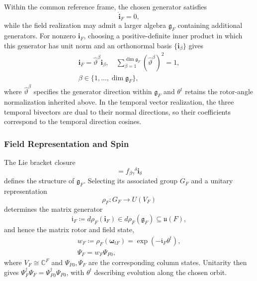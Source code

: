 Within the common reference frame, the chosen generator satisfies
\begin{equation}
    \dot{\mathbf{i}}_{F}=0,
\end{equation}
while the field realization may admit a larger algebra $\mathfrak{g}_{F}$ containing additional generators. For nonzero $\mathbf{i}_{F}$, choosing a positive-definite inner product in which this generator has unit norm and an orthonormal basis $\{\mathbf{i}_{\beta}\}$ gives
\begin{equation}\label{eq_generator_direction}
\begin{gathered}
    \mathbf{i}_{F}=\hat{\vartheta}^{\beta}\mathbf{i}_{\beta},\quad\sum_{\beta=1}^{\dim\mathfrak{g}_{F}}(\hat{\vartheta}^{\beta})^{2}=1,\\
    \beta\in\{1,\ldots,\dim\mathfrak{g}_{F}\},
\end{gathered}
\end{equation}
where $\hat{\vartheta}^{\beta}$ specifies the generator direction within $\mathfrak{g}_{F}$ and $\theta^{t}$ retains the rotor-angle normalization inherited above. In the temporal vector realization, the three temporal bivectors are dual to their normal directions, so their coefficients correspond to the temporal direction cosines.

\subsubsection{Field Representation and Spin}
The Lie bracket closure
\begin{equation}
    [\mathbf{i}_{\beta},\mathbf{i}_{\gamma}]=f_{\beta\gamma}{}^{\delta}\mathbf{i}_{\delta}
\end{equation}
defines the structure of $\mathfrak{g}_{F}$. Selecting its associated group $G_{F}$ and a unitary representation
\begin{equation}
    \rho_{F}:G_{F}\rightarrow U(V_{F})
\end{equation}
determines the matrix generator
\begin{equation}
    \mathfrak{i}_{F}\coloneqq d\rho_{F}(\mathbf{i}_{F})\in d\rho_{F}(\mathfrak{g}_{F})\subseteq\mathfrak{u}(F),
\end{equation}
and hence the matrix rotor and field state,
\begin{equation}
\begin{gathered}
    w_{F}\coloneqq\rho_{F}(\boldsymbol{\omega}_{tF})=\exp(-\mathfrak{i}_{F}\theta^{t}),\\
    \Psi_{F}=w_{F}\Psi_{F0},
\end{gathered}
\end{equation}
where $V_{F}\cong\mathbb{C}^{F}$ and $\Psi_{F0},\Psi_{F}$ are the corresponding column states. Unitarity then gives $\Psi_{F}^{\dagger}\Psi_{F}=\Psi_{F0}^{\dagger}\Psi_{F0}$, with $\theta^{t}$ describing evolution along the chosen orbit.

